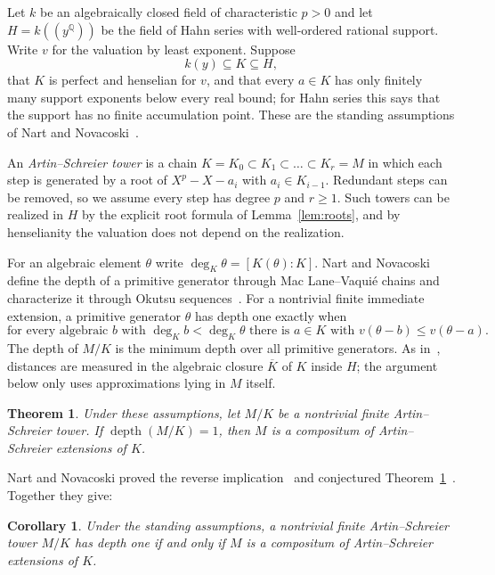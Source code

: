 \documentclass[11pt]{article}
\newtheorem{theorem}{Theorem}
\newtheorem{corollary}{Corollary}
\newcommand{\Q}{\mathbb Q}
\newcommand{\depth}{\operatorname{depth}}
\begin{document}
Let $k$ be an algebraically closed field of characteristic $p>0$ and let $H=k((y^\Q))$ be the field of Hahn series with well-ordered rational support. Write $v$ for the valuation by least exponent. Suppose
\[
k(y)\subseteq K\subseteq H,
\]
that $K$ is perfect and henselian for $v$, and that every $a\in K$ has only finitely many support exponents below every real bound; for Hahn series this says that the support has no finite accumulation point. These are the standing assumptions of Nart and Novacoski~\cite[\S3]{NN}.

An \emph{Artin--Schreier tower} is a chain $K=K_0\subset K_1\subset\dots\subset K_r=M$ in which each step is generated by a root of $X^p-X-a_i$ with $a_i\in K_{i-1}$. Redundant steps can be removed, so we assume every step has degree $p$ and $r\ge1$. Such towers can be realized in $H$ by the explicit root formula of Lemma~\ref{lem:roots}, and by henselianity the valuation does not depend on the realization.

For an algebraic element $\theta$ write $\deg_K\theta=[K(\theta):K]$. Nart and Novacoski define the depth of a primitive generator through Mac Lane--Vaquié chains and characterize it through Okutsu sequences~\cite[Definition~1.2, Theorem~1.3]{NN}. For a nontrivial finite immediate extension, a primitive generator $\theta$ has depth one exactly when
\begin{equation}\label{eq:depthone}
\text{for every algebraic } b \text{ with } \deg_K b<\deg_K\theta \text{ there is } a\in K \text{ with } v(\theta-b)\le v(\theta-a).
\end{equation}
The depth of $M/K$ is the minimum depth over all primitive generators. As in~\cite[\S3]{NN}, distances are measured in the algebraic closure $\overline K$ of $K$ inside $H$; the argument below only uses approximations lying in $M$ itself.

\begin{theorem}\label{thm:main}
Under these assumptions, let $M/K$ be a nontrivial finite Artin--Schreier tower. If $\depth(M/K)=1$, then $M$ is a compositum of Artin--Schreier extensions of $K$.
\end{theorem}

Nart and Novacoski proved the reverse implication~\cite[Theorem~3.15]{NN} and conjectured Theorem~\ref{thm:main}~\cite[Conjecture~4.1]{NN}. Together they give:

\begin{corollary}
Under the standing assumptions, a nontrivial finite Artin--Schreier tower $M/K$ has depth one if and only if $M$ is a compositum of Artin--Schreier extensions of $K$.
\end{corollary}
\end{document}
